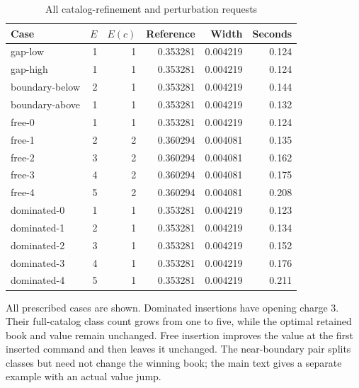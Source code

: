 \begin{table}[p]\centering
\caption{All catalog-refinement and perturbation requests}\label{tab:robustec52}
\setlength{\tabcolsep}{4pt}
\begin{tabular}{lrrrrr}
\toprule
Case & $E$ & $E(c)$ & Reference & Width & Seconds\\
\midrule
gap-low & 1 & 1 & 0.353281 & 0.004219 & 0.124\\
gap-high & 1 & 1 & 0.353281 & 0.004219 & 0.124\\
boundary-below & 2 & 1 & 0.353281 & 0.004219 & 0.144\\
boundary-above & 1 & 1 & 0.353281 & 0.004219 & 0.132\\
free-0 & 1 & 1 & 0.353281 & 0.004219 & 0.124\\
free-1 & 2 & 2 & 0.360294 & 0.004081 & 0.135\\
free-2 & 3 & 2 & 0.360294 & 0.004081 & 0.162\\
free-3 & 4 & 2 & 0.360294 & 0.004081 & 0.175\\
free-4 & 5 & 2 & 0.360294 & 0.004081 & 0.208\\
dominated-0 & 1 & 1 & 0.353281 & 0.004219 & 0.123\\
dominated-1 & 2 & 1 & 0.353281 & 0.004219 & 0.134\\
dominated-2 & 3 & 1 & 0.353281 & 0.004219 & 0.152\\
dominated-3 & 4 & 1 & 0.353281 & 0.004219 & 0.176\\
dominated-4 & 5 & 1 & 0.353281 & 0.004219 & 0.211\\
\bottomrule\end{tabular}
\par\vspace{6pt}\begin{minipage}{\textwidth}All prescribed cases are shown. Dominated insertions have opening charge 3. Their full-catalog class count grows from one to five, while the optimal retained book and value remain unchanged. Free insertion improves the value at the first inserted command and then leaves it unchanged. The near-boundary pair splits classes but need not change the winning book; the main text gives a separate example with an actual value jump.\end{minipage}
\end{table}

